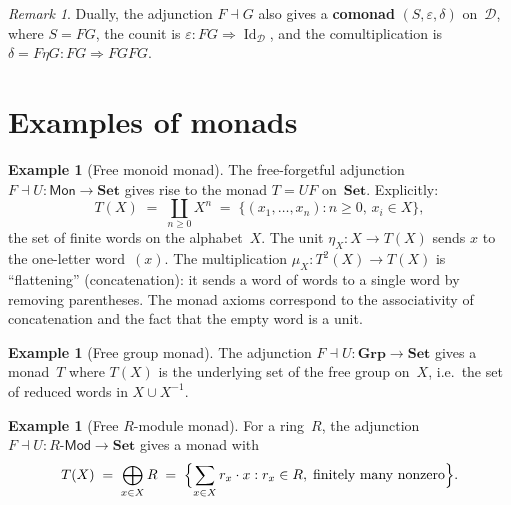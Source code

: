 \documentclass[a4paper,12pt]{book}
\DeclareMathOperator{\Id}{Id}
\newcommand{\Set}{\mathbf{Set}}
\newcommand{\Grp}{\mathbf{Grp}}
\theoremstyle{definition}
\newtheorem{example}[definition]{Example}
\theoremstyle{plain}
\theoremstyle{remark}
\newtheorem{remark}[definition]{Remark}
\begin{document}
\begin{remark}\label{rem:comonad}
Dually, the adjunction $F\dashv G$ also gives a \textbf{comonad}
$(S,\varepsilon,\delta)$ on~$\mathcal{D}$, where $S = FG$,
the counit is $\varepsilon\colon FG\Rightarrow\Id_{\mathcal{D}}$,
and the comultiplication is $\delta = F\eta G\colon FG\Rightarrow FGFG$.
\end{remark}


\section{Examples of monads}\label{sec:monad-examples}

\begin{example}[Free monoid monad]\label{ex:monad-free-monoid}
The free-forgetful adjunction $F\dashv U\colon\mathsf{Mon}\to\Set$
gives rise to the monad $T = UF$ on~$\Set$.  Explicitly:
\[
    T(X) \;=\; \coprod_{n\geq 0} X^n \;=\;
    \{(x_1,\ldots,x_n) : n\geq 0,\, x_i\in X\},
\]
the set of finite words on the alphabet~$X$.
The unit $\eta_X\colon X\to T(X)$ sends $x$ to the one-letter
word~$(x)$.  The multiplication $\mu_X\colon T^2(X)\to T(X)$ is
``flattening'' (concatenation): it sends a word of words to a single
word by removing parentheses.  The monad axioms correspond to the
associativity of concatenation and the fact that the empty word is
a unit.
\end{example}

\begin{example}[Free group monad]\label{ex:monad-free-group}
The adjunction $F\dashv U\colon\Grp\to\Set$ gives a monad~$T$
where $T(X)$ is the underlying set of the free group on~$X$, i.e.\
the set of reduced words in $X\cup X^{-1}$.
\end{example}

\begin{example}[Free $R$-module monad]\label{ex:monad-free-module}
\index{monad!free module}
For a ring~$R$, the adjunction $F\dashv U\colon R\text{-}\mathsf{Mod}\to\Set$
gives a monad with
\[
    T(X) \;=\; \bigoplus_{x\in X} R \;=\;
    \Bigl\{\sum_{x\in X} r_x\cdot x :
    r_x\in R,\;\text{finitely many nonzero}\Bigr\}.
\]
\end{example}
\end{document}
